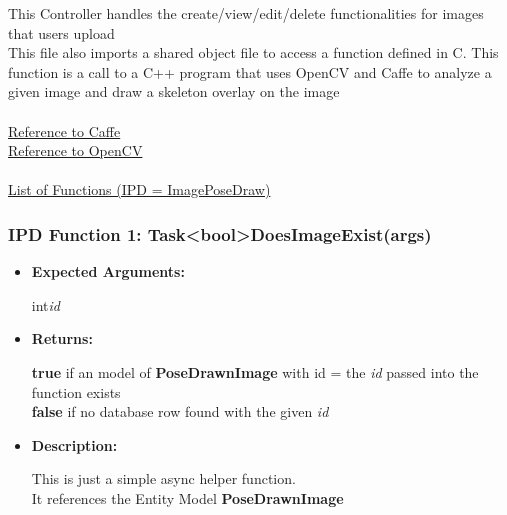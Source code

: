 \documentclass{scrreprt}
\begin{document}
This Controller handles the create/view/edit/delete functionalities for images that users upload
\\
This file also imports a shared object file to access a function defined in C. This function is a call to a C++ program that uses OpenCV and Caffe to analyze a given image and draw a skeleton overlay on the image
\\\\
\href{http://caffe.berkeleyvision.org/doxygen/index.html}{Reference to Caffe}
\\
\href{http://docs.opencv.org/3.1.0/}{Reference to OpenCV}
\\\\
\underline{List of Functions (IPD = ImagePoseDraw)}

\subsubsection{IPD Function 1: Task\textless bool\textgreater DoesImageExist(args)}
\begin{itemize}
    \item \textbf{Expected Arguments:}

    int\quad\textit{id}

    \item \textbf{Returns:}

    \textbf{true} if an model of \textbf{PoseDrawnImage} with id = the \textit{id} passed into the function exists
    \\
    \textbf{false} if no database row found with the given \textit{id}

    \item \textbf{Description:}

    This is just a simple async helper function.
    \\
    It references the Entity Model \textbf{PoseDrawnImage}
\end{itemize}
\end{document}
